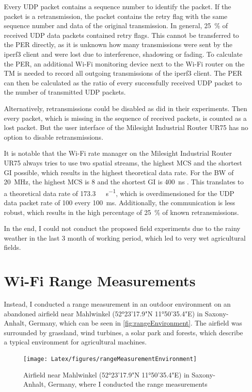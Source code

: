Every \ac{UDP} packet contains a sequence number to identify the packet.
If the packet is a retransmission, the packet contains the retry flag
with the same sequence number and data of the original transmission.
In general, \SI{25}{\percent} of received \ac{UDP} data packets contained retry flags.
This cannot be transferred to the \ac{PER} directly,
as it is unknown how many transmissions were sent by the iperf3 client and were lost due to interference, shadowing or fading.
To calculate the \ac{PER}, an additional Wi-Fi monitoring device next to the Wi-Fi router on the \ac{TM} is needed to record all
outgoing transmissions of the iperf3 client.
The \ac{PER} can then be calculated as the ratio of every successfully received \ac{UDP} packet to the number of transmitted \ac{UDP} packets.

Alternatively, retransmissions could be disabled as \textcite{klingler_agriculture_2018} did in their experiments.
Then every packet, which is missing in the sequence of received packets, is counted as a lost packet.
But the user interface of the Milesight Industrial Router UR75 has no option to disable retransmissions.

It is notable that the Wi-Fi rate manager on the Milesight Industrial Router UR75 always tries to use two spatial streams, the highest \ac{MCS} and the shortest \ac{GI} possible,
which results in the highest theoretical data rate.
For the \ac{BW} of \SI{20}{\mega\hertz}, the highest \ac{MCS} is \num{8} and the shortest \ac{GI} is \SI{400}{\nano\second} \cite{ieee_standard_2020}.
This translates to a theoretical data rate of \SI{173.3}{\mega\bit\per\second}, which is overdimensioned for the \ac{UDP} data packet rate of \SI{100}{\byte}
every \SI{100}{\milli\second}.
Additionally, the communication is less robust, which results in the high percentage of \SI{25}{\percent} of known retransmissions.

In the end, I could not conduct the proposed field experiments due to the rainy weather in the last \num{3} month of working period, which led to very wet agricultural fields.

\section{Wi-Fi Range Measurements}
Instead, I conducted a range measurement in an outdoor environment on an abandoned airfield near Mahlwinkel (52°23'17.9"N 11°50'35.4"E) in Saxony-Anhalt, Germany,
which can be seen in \autoref{fig:rangeEnvironment}.
The airfield was surrounded by grassland, wind turbines, a solar park and forests, which describe a typical environment for agricultural machines.
\begin{figure}[H]%
   \centering
   \texttt{[image: Latex/figures/rangeMeasurementEnvironment]}
   \caption{Airfield near Mahlwinkel (52°23'17.9"N 11°50'35.4"E) in Saxony-Anhalt, Germany, where I conducted the range measurements}
   \label{fig:rangeEnvironment}%
\end{figure}


